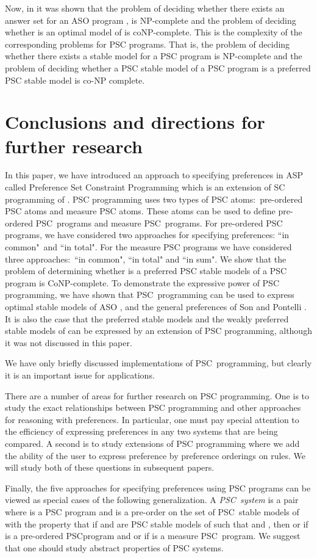 \documentclass[letterpaper]{article}\usepackage{aaai}
\begin{document}
Now, in \cite{BNT03} it was shown that the problem of deciding whether there
exists an answer set for an ASO program ,  is
NP-complete and the problem of deciding whether  is an optimal model of  is coNP-complete. This is the complexity of the corresponding problems for
PSC programs. That is, the problem of deciding whether there exists a stable
model for a PSC program  is NP-complete and the problem of deciding whether
a PSC stable model  of a PSC program  is a preferred PSC stable model is
co-NP complete.

\section{Conclusions and directions for further research}

In this paper, we have introduced an approach to specifying preferences in ASP
called Preference Set Constraint Programming which is an extension of SC
programming of \cite{MR}. PSC programming uses two types of PSC
atoms:\ pre-ordered PSC atoms and measure PSC atoms. These atoms can be used
to define pre-ordered PSC\ programs and measure PSC\ programs. For pre-ordered
PSC programs, we have considered two approaches for specifying preferences:
\textquotedblleft in common"\ and \textquotedblleft in total". For the measure
PSC programs we have considered three approaches:\ \textquotedblleft in
common", \textquotedblleft in total" and \textquotedblleft in sum". We show
that the problem of determining whether  is a preferred PSC stable models
of a PSC program is CoNP-complete. To demonstrate the expressive power of PSC
programming, we have shown that PSC\ programming can be used to express
optimal stable models of ASO \cite{BNT03}, and the general preferences of Son
and Pontelli \cite{SP}. It is also the case that the preferred stable models
and the weakly preferred stable models of \cite{BrewkaE99} can be expressed by
an extension of PSC programming, although it was not discussed in this paper.

We have only briefly discussed implementations of PSC\ programming, but
clearly it is an important issue for applications.

There are a number of areas for further research on PSC programming. One is to
study the exact relationships between PSC programming and other approaches for
reasoning with preferences. In particular, one must pay special attention to
the efficiency of expressing preferences in any two systems that are being
compared. A second is to study extensions of PSC programming where we add the
ability of the user to express preference by preference orderings on rules. We
will study both of these questions in subsequent papers.

Finally, the five approaches for specifying preferences using PSC programs can
be viewed as special cases of the following generalization. A
\emph{PSC\ system}  is a pair  where 
is a PSC program and  is a pre-order on the set of PSC\ stable models of
 with the property that if  and  are PSC stable models of 
such that   
and , then  or  if  is a
pre-ordered PSCprogram and  or 
if  is a measure PSC\ program. We suggest that one should study abstract
properties of PSC systems.



\end{document}
